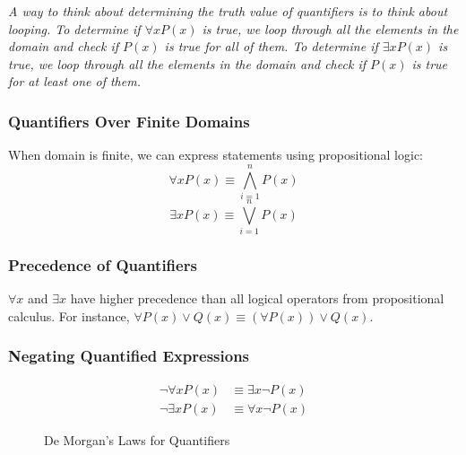 \documentclass[article, 11pt]{article}
\theoremstyle{definition}
\begin{document}
    \textit{A way to think about determining the truth value of quantifiers is to think about looping. To determine if $\forall x P(x)$ is true, we loop through all the elements in the domain and check if $P(x)$ is true for all of them. To determine if $\exists x P(x)$ is true, we loop through all the elements in the domain and check if $P(x)$ is true for at least one of them.}
    \subsubsection{Quantifiers Over Finite Domains}
    When domain is finite, we can express statements using propositional logic:
    \begin{equation*}
        \forall x P(x) \equiv \bigwedge_{i=1}^{n} P(x)
    \end{equation*}
    \begin{equation*}
        \exists x P(x) \equiv \bigvee_{i=1}^{n} P(x)
    \end{equation*}
    \subsubsection{Precedence of Quantifiers}
    $\forall x$ and $\exists x$ have higher precedence than all logical operators from propositional calculus. For instance, $\forall P(x) \lor Q(x) \equiv (\forall P(x)) \lor Q(x)$.
    \subsubsection{Negating Quantified Expressions}
    \begin{figure}[H]
        \begin{align*}
            \neg \forall x P(x) &\equiv \exists x \neg P(x) \\
            \neg \exists x P(x) &\equiv \forall x \neg P(x)
        \end{align*}
        \caption{De Morgan's Laws for Quantifiers}
    \end{figure}
\end{document}
